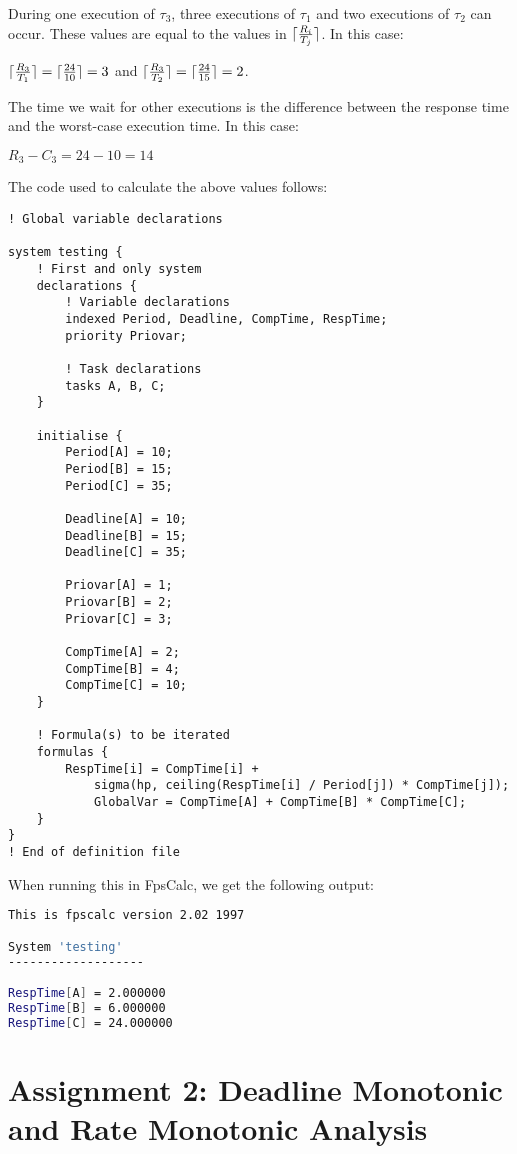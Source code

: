 \documentclass[a4paper,10pt]{article}
\DeclarePairedDelimiter{\ceil}{\lceil}{\rceil}
\begin{document}
\begin{enumerate}
	During one execution of $\tau_3$, three executions of $\tau_1$ and two executions of $\tau_2$ can occur. These values are equal to the values in $\ceil{\frac{R_i}{T_j}}$. In this case:
	
	$\ceil{\frac{R_3}{T_1}} = \ceil{\frac{24}{10}} = 3$ and $\ceil{\frac{R_3}{T_2}} = \ceil{\frac{24}{15}} = 2$.
	
	The time we wait for other executions is the difference between the response time and the worst-case execution time. In this case:
	
	$R_3 - C_3 = 24 - 10 = 14$
	
	The code used to calculate the above values follows:
	
\begin{lstlisting}
! Global variable declarations

system testing {
	! First and only system
	declarations {		
		! Variable declarations
		indexed Period, Deadline, CompTime, RespTime;
		priority Priovar;	
			      	       
		! Task declarations
		tasks A, B, C;
	}

	initialise {
		Period[A] = 10;
		Period[B] = 15;
		Period[C] = 35;
	  
		Deadline[A] = 10;
		Deadline[B] = 15;
		Deadline[C] = 35;

		Priovar[A] = 1;
		Priovar[B] = 2;
		Priovar[C] = 3;

		CompTime[A] = 2;
		CompTime[B] = 4;
		CompTime[C] = 10;
	}

	! Formula(s) to be iterated
	formulas {
		RespTime[i] = CompTime[i] +
			sigma(hp, ceiling(RespTime[i] / Period[j]) * CompTime[j]);
			GlobalVar = CompTime[A] + CompTime[B] * CompTime[C];
	}
}				   
! End of definition file

\end{lstlisting}

When running this in FpsCalc, we get the following output:

\begin{lstlisting}[language=bash]
This is fpscalc version 2.02 1997

System 'testing'
-------------------

RespTime[A] = 2.000000
RespTime[B] = 6.000000
RespTime[C] = 24.000000
\end{lstlisting}

\end{enumerate}

\section{Assignment 2: Deadline Monotonic and Rate Monotonic Analysis}
\end{document}
